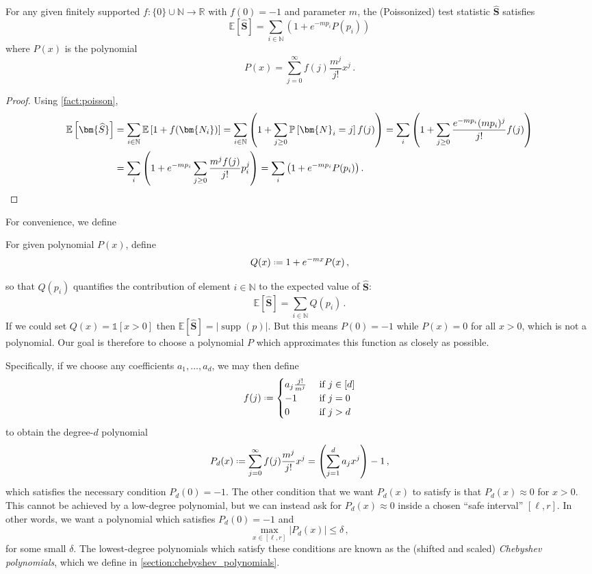 \documentclass{theoretics}
\DeclareMathOperator{\supp}{supp}   %
\newcommand{\Ex}[1]{\bE \left[ #1 \right]}
\renewcommand{\Pr}[1]{\bP \left[ #1 \right]} %
\newcommand*{\define}{\mathrel{\vcenter{\baselineskip0.5ex \lineskiplimit0pt
                      \hbox{\scriptsize.}\hbox{\scriptsize.}}}%
                      =}
\newcommand{\ind}[1]{\mathds{1} \left[ #1 \right] }
\newcommand{\bE}{\ensuremath{\mathbb{E}}}
\newcommand{\bN}{\ensuremath{\mathbb{N}}}
\newcommand{\bP}{\ensuremath{\mathbb{P}}}
\newcommand{\bR}{\ensuremath{\mathbb{R}}}
\begin{document}
\begin{proposition}
For any given finitely supported $f \colon \{0\} \cup \bN \to \bR$ with $f(0) = -1$ and parameter
$m$, the (Poissonized) test statistic $\widehat{\bm S}$ satisfies
\begin{equation}
\label{eq:mean-P}
  \Ex{ \widehat{ \bm S } }
  = \sum_{i \in \bN} ( 1 + e^{-mp_i} P(p_i) )
\end{equation}
where $P(x)$ is the polynomial
\[
  P(x) = \sum_{j=0}^\infty f(j) \frac{m^j}{j!} x^j \,.
\]
\end{proposition}
\begin{proof}
Using \cref{fact:poisson},
\begin{align*}
        \Ex{\bm{\widehat S}}
        &= \sum_{i \in \bN} \Ex{1 + f(\bm{N_i}) }
         = \sum_{i \in \bN} \left( 1 + \sum_{j \ge 0} \Pr{\bm{N}_i = j} f(j) \right) 
        = \sum_{i} \left( 1 + \sum_{j \ge 0} \frac{e^{-mp_i}(mp_i)^j}{j!} f(j) \right) \\
        &= \sum_{i} \left(
            1 + e^{-mp_i} \sum_{j \ge 0} \frac{m^j f(j)}{j!} p_i^j \right)
        = \sum_{i} \left( 1 + e^{-mp_i} P(p_i) \right). \qedhere
\end{align*}
\end{proof}
For convenience, we define
\begin{definition}
\label{def:Q}
For given polynomial $P(x)$, define
\[
  Q(x) \define 1 + e^{-mx} P(x) \,,
\]
\end{definition}
\noindent
so that $Q(p_i)$ quantifies the contribution of element $i \in \bN$
to the expected value of $\bm{\widehat S}$:
\begin{equation}
\label{eq:mean-Q}
  \Ex{\bm{\widehat S}} = \sum_{i \in \bN} Q(p_i) \,.
\end{equation}
If we could set $Q(x) = \ind{x > 0}$ then $\Ex{\bm{\widehat S}} = |\supp(p)|$.  But this
means $P(0) = -1$ while $P(x) = 0$ for all $x > 0$, which is not a polynomial.
Our goal is therefore to choose a polynomial $P$ which approximates this function as closely as
possible.

Specifically, if we choose any coefficients $a_1, \dotsc, a_d$, we may then define
\[
    f(j) \define \begin{cases}
      a_j \frac{j!}{m^j} &\text{ if } j \in [d] \\
      -1 &\text{ if } j = 0 \\
      0 &\text{ if } j > d 
    \end{cases}
\]
to obtain the degree-$d$ polynomial
\[
  P_d(x) \define \sum_{j=0}^\infty f(j) \frac{m^j}{j!} x^j = \left(\sum_{j=1}^d a_j x^j\right) - 1
  \,,
\]
which satisfies the necessary condition $P_d(0) = -1$. The other condition that we want $P_d(x)$ to
satisfy is that $P_d(x) \approx 0$ for $x > 0$. This cannot be achieved by a low-degree polynomial,
but we can instead ask for $P_d(x) \approx 0$ inside a chosen ``safe interval'' $[\ell, r]$. In other words,
we want a polynomial which satisfies $P_d(0) = -1$ and
\[
  \max_{x \in [\ell, r]} |P_d(x)| \leq \delta \,,
\]
for some small $\delta$. The lowest-degree polynomials which satisfy these conditions are known
as the (shifted and scaled) \emph{Chebyshev polynomials}, which we define in
\cref{section:chebyshev_polynomials}.
\end{document}
